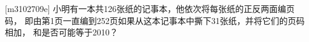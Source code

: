 [m3102709e]\quad
小明有一本共126张纸的记事本，他依次将每张纸的正反两面编页码，
即由第1页一直编到252页如果从这本记事本中撕下31张纸，并将它们的页码相加，
和是否可能等于2010？
\par
{}